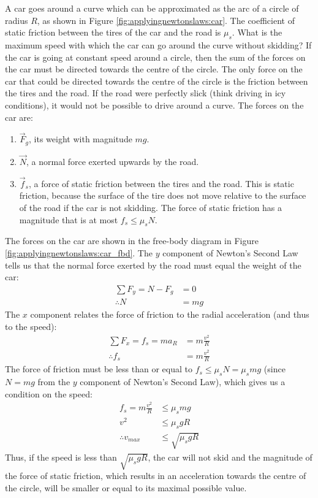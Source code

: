 \begin{example}{\label{ex:applyingnewtonslaws:car}
A car goes around a curve which can be approximated as the arc of a circle of radius $R$, as shown in Figure \ref{fig:applyingnewtonslaws:car}. The coefficient of static friction between the tires of the car and the road is $\mu_s$. What is the maximum speed with which the car can go around the curve without skidding?
}
If the car is going at constant speed around a circle, then the sum of the forces on the car must be directed towards the centre of the circle. The only force on the car that could be directed towards the centre of the circle is the friction between the tires and the road. If the road were perfectly slick (think driving in icy conditions), it would not be possible to drive around a curve. The forces on the car are:
\begin{enumerate}
\item $\vec F_g$, its weight with magnitude $mg$.
\item $\vec N$, a normal force exerted upwards by the road.
\item $\vec f_s$, a force of static friction between the tires and the road. This is static friction, because the surface of the tire does not move relative to the surface of the road if the car is not skidding. The force of static friction has a magnitude that is at most $f_s\leq\mu_sN$.
\end{enumerate}
The forces on the car are shown in the free-body diagram in Figure \ref{fig:applyingnewtonslaws:car_fbd}.
The $y$ component of Newton's Second Law tells us that the normal force exerted by the road must equal the weight of the car:
\begin{align*}
\sum F_y = N-F_g&=0\\
\therefore N &=mg
\end{align*}
The $x$ component relates the force of friction to the radial acceleration (and thus to the speed):
\begin{align*}
\sum F_x = f_s =ma_R&=m\frac{v^2}{R}\\
\therefore f_s &= m\frac{v^2}{R}
\end{align*}
The force of friction must be less than or equal to $f_s\leq\mu_sN=\mu_smg$ (since $N=mg$ from the $y$ component of Newton's Second Law), which gives us a condition on the speed:
\begin{align*}
f_s = m\frac{v^2}{R}&\leq\mu_smg\\
v^2 &\leq \mu_s g R\\
\therefore v_{max} &\leq \sqrt{\mu_s g R}
\end{align*}
Thus, if the speed is less than $\sqrt{\mu_s g R}$, the car will not skid and the magnitude of the force of static friction, which results in an acceleration towards the centre of the circle, will be smaller or equal to its maximal possible value.


\end{example}

